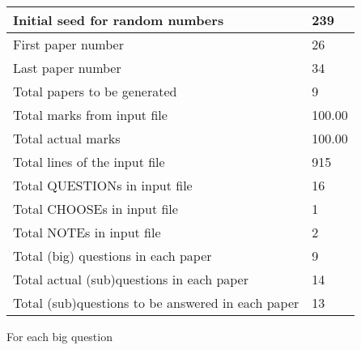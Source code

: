 \documentclass[12pt]{article}
\begin{document}
 \begin{tabular}{|l|l|}
 \hline
 Initial seed for random numbers &         239  \\
\hline
 First paper number &          26  \\
\hline
 Last  paper number &          34  \\
\hline
 Total papers to be generated &           9  \\
\hline
Total marks from input file & 100.00 \\
\hline
Total actual marks & 100.00 \\
\hline
 Total lines of the input file &         915  \\
 \hline
 Total QUESTIONs in input file &          16  \\
\hline
 Total CHOOSEs in input file &           1  \\
\hline
 Total NOTEs in input file &           2  \\
\hline
 Total (big) questions in each paper &           9  \\
\hline
 Total actual (sub)questions in each paper &          14  \\
\hline
 Total (sub)questions to be answered in each paper &          13  \\
\hline
 \end{tabular}
   
   
 \newpage
   
{\LARGE{For each big question}}
   
   
\vspace{0.2in}
   
\end{document}
